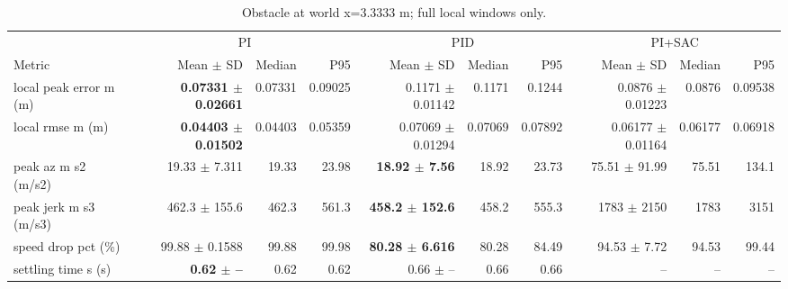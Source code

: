 \begin{table}[t]
\centering
\scriptsize
\caption{Obstacle at world x=3.3333 m; full local windows only.}
\label{tab:obstacle-6}
\begin{tabular}{p{}*{9}{r}}
\toprule
 & \multicolumn{3}{c}{PI} & \multicolumn{3}{c}{PID} & \multicolumn{3}{c}{PI+SAC} \\
\cmidrule(lr){2-4}\cmidrule(lr){5-7}\cmidrule(lr){8-10}
Metric & Mean $\pm$ SD & Median & P95 & Mean $\pm$ SD & Median & P95 & Mean $\pm$ SD & Median & P95 \\
\midrule
local peak error m (m) & \textbf{0.07331 $\pm$ 0.02661} & 0.07331 & 0.09025 & 0.1171 $\pm$ 0.01142 & 0.1171 & 0.1244 & 0.0876 $\pm$ 0.01223 & 0.0876 & 0.09538 \\
local rmse m (m) & \textbf{0.04403 $\pm$ 0.01502} & 0.04403 & 0.05359 & 0.07069 $\pm$ 0.01294 & 0.07069 & 0.07892 & 0.06177 $\pm$ 0.01164 & 0.06177 & 0.06918 \\
peak az m s2 (m/s2) & 19.33 $\pm$ 7.311 & 19.33 & 23.98 & \textbf{18.92 $\pm$ 7.56} & 18.92 & 23.73 & 75.51 $\pm$ 91.99 & 75.51 & 134.1 \\
peak jerk m s3 (m/s3) & 462.3 $\pm$ 155.6 & 462.3 & 561.3 & \textbf{458.2 $\pm$ 152.6} & 458.2 & 555.3 & 1783 $\pm$ 2150 & 1783 & 3151 \\
speed drop pct (\%) & 99.88 $\pm$ 0.1588 & 99.88 & 99.98 & \textbf{80.28 $\pm$ 6.616} & 80.28 & 84.49 & 94.53 $\pm$ 7.72 & 94.53 & 99.44 \\
settling time s (s) & \textbf{0.62 $\pm$ --} & 0.62 & 0.62 & 0.66 $\pm$ -- & 0.66 & 0.66 & -- & -- & -- \\
\bottomrule
\end{tabular}
\end{table}
